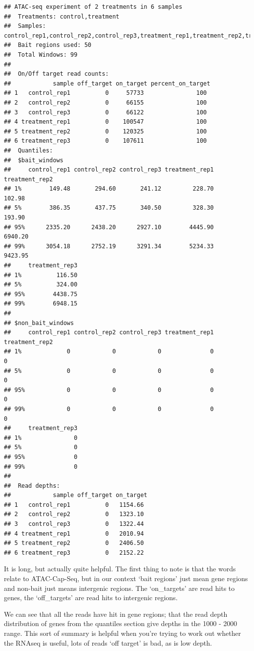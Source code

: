 \documentclass[]{book}
\begin{document}
\begin{verbatim}
## ATAC-seq experiment of 2 treatments in 6 samples
##  Treatments: control,treatment 
##  Samples: control_rep1,control_rep2,control_rep3,treatment_rep1,treatment_rep2,treatment_rep3 
##  Bait regions used: 50 
##  Total Windows: 99 
##  
##  On/Off target read counts:
##            sample off_target on_target percent_on_target
## 1   control_rep1          0     57733               100
## 2   control_rep2          0     66155               100
## 3   control_rep3          0     66122               100
## 4 treatment_rep1          0    100547               100
## 5 treatment_rep2          0    120325               100
## 6 treatment_rep3          0    107611               100 
##  Quantiles: 
##  $bait_windows
##     control_rep1 control_rep2 control_rep3 treatment_rep1 treatment_rep2
## 1%        149.48       294.60       241.12         228.70         102.98
## 5%        386.35       437.75       340.50         328.30         193.90
## 95%      2335.20      2438.20      2927.10        4445.90        6940.20
## 99%      3054.18      2752.19      3291.34        5234.33        9423.95
##     treatment_rep3
## 1%          116.50
## 5%          324.00
## 95%        4438.75
## 99%        6948.15
## 
## $non_bait_windows
##     control_rep1 control_rep2 control_rep3 treatment_rep1 treatment_rep2
## 1%             0            0            0              0              0
## 5%             0            0            0              0              0
## 95%            0            0            0              0              0
## 99%            0            0            0              0              0
##     treatment_rep3
## 1%               0
## 5%               0
## 95%              0
## 99%              0
##  
##  Read depths:
##            sample off_target on_target
## 1   control_rep1          0   1154.66
## 2   control_rep2          0   1323.10
## 3   control_rep3          0   1322.44
## 4 treatment_rep1          0   2010.94
## 5 treatment_rep2          0   2406.50
## 6 treatment_rep3          0   2152.22
\end{verbatim}

It is long, but actually quite helpful. The first thing to note is that the words relate to ATAC-Cap-Seq, but in our context `bait regions' just mean gene regions and non-bait just means intergenic regions. The `on\_targets' are read hits to genes, the `off\_targets' are read hits to intergenic regions.

We can see that all the reads have hit in gene regions; that the read depth distribution of genes from the quantiles section give depths in the 1000 - 2000 range. This sort of summary is helpful when you're trying to work out whether the RNAseq is useful, lots of reads `off target' is bad, as is low depth.
\end{document}
